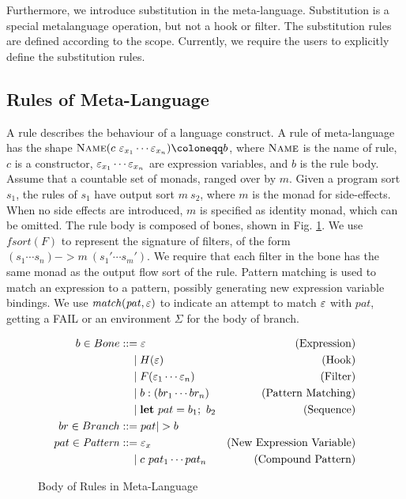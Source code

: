 Furthermore, we introduce substitution in the meta-language.
Substitution is a special metalanguage operation, but not a hook or filter. 
The substitution rules are defined according to the scope.
Currently, we require the users to explicitly define the substitution rules.

\subsection{Rules of Meta-Language}

A rule describes the behaviour of a language construct.
A rule of meta-language has the shape $\ctr{Name}{c~\mexp_{x_1}\cdots \mexp_{x_n}} \cqq b$, 
where $\textsc{Name}$ is the name of rule,
$c$ is a constructor, 
$\varepsilon_{x_1}\cdots \varepsilon_{x_n}$ are expression variables,
and $b$ is the rule body.
Assume that a countable set of monads, ranged over by $m$.
Given a program sort $s_1$, the rules of $s_1$ have output sort $m~s_2$,
 where $m$ is the monad for side-effects.
When no side effects are introduced, $m$ is specified as identity monad, which can be omitted.
The rule body is composed of bones, shown in Fig. \ref{fig:body}.
We use $\mathit{fsort}(F)$ to represent the signature of filters, of the form $(s_1\cdots s_n) -> m~(s_1'\cdots s_m')$.
We require that each filter in the bone has the same monad as the output flow sort of the rule.
Pattern matching is used to match an expression to a pattern, possibly generating new expression variable bindings.
We use $\mathit{match(pat,\varepsilon)}$ to indicate an attempt to match $\varepsilon$ with $pat$,
 getting a FAIL or an environment $Σ$ for the body of branch.

\begin{figure}
  \begin{align*}
    b \in Bone 
      & ::= \mexp & \text{(Expression)} \\
      & \quad \mid H(\mexp) & \text{(Hook)} \\
      & \quad \mid F(\mexp_1\cdots \mexp_n) & \text{(Filter)} \\
      & \quad \mid b:(br_1\cdots br_n) & \text{(Pattern Matching)} \\
      & \quad \mid \Let{pat}{b_1} b_2 & \text{(Sequence)} \\
    br \in Branch
      & ::= pat |> b \\
    pat \in \mathit{Pattern}
      & ::= \mexp_x & \text{(New Expression Variable)} \\
      & \quad \mid c~pat_1\cdots pat_n & \text{(Compound Pattern)}
  \end{align*}
\caption{Body of Rules in Meta-Language}
\label{fig:body}
\end{figure}


